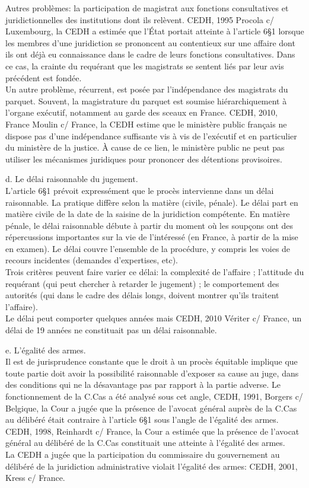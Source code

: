 \documentclass[10pt, a4paper, openany]{book}
\begin{document}
Autres problèmes: la participation de magistrat aux fonctions consultatives et juridictionnelles des institutions dont ils relèvent. CEDH, 1995 Procola c/ Luxembourg, la CEDH a estimée que l'État portait atteinte à l'article 6§1 lorsque les membres d'une juridiction se prononcent au contentieux sur une affaire dont ils ont déjà eu connaissance dans le cadre de leurs fonctions consultatives. Dans ce cas, la crainte du requérant que les magistrats se sentent liés par leur avis précédent est fondée. \\
Un autre problème, récurrent, est posée par l'indépendance des magistrats du parquet. Souvent, la magistrature du parquet est soumise hiérarchiquement à l'organe exécutif, notamment au garde des sceaux en France. CEDH, 2010, France Moulin c/ France, la CEDH estime que le ministère public français ne dispose pas d'une indépendance suffisante vis à vis de l'exécutif et en particulier du ministère de la justice. À cause de ce lien, le ministère public ne peut pas utiliser les mécanismes juridiques pour prononcer des détentions provisoires. 


d. Le délai raisonnable du jugement. \\
L'article 6§1 prévoit expressément que le procès intervienne dans un délai raisonnable. La pratique diffère selon la matière (civile, pénale). Le délai part en matière civile de la date de la saisine de la juridiction compétente. En matière pénale, le délai raisonnable débute à partir du moment où les soupçons ont des répercussions importantes sur la vie de l'intéressé (en France, à partir de la mise en examen). Le délai couvre l'ensemble de la procédure, y compris les voies de recours incidentes (demandes d'expertises, etc). \\
Trois critères peuvent faire varier ce délai: la complexité de l'affaire ; l'attitude du requérant (qui peut chercher à retarder le jugement) ; le comportement des autorités (qui dans le cadre des délais longs, doivent montrer qu'ils traitent l'affaire). \\
Le délai peut comporter quelques années mais CEDH, 2010 Vériter c/ France, un délai de 19 années ne constituait pas un délai raisonnable. 


e. L'égalité des armes. \\
Il est de jurisprudence constante que le droit à un procès équitable implique que toute partie doit avoir la possibilité raisonnable d'exposer sa cause au juge, dans des conditions qui ne la désavantage pas par rapport à la partie adverse. Le fonctionnement de la C.Cas a été analysé sous cet angle, CEDH, 1991, Borgers c/ Belgique, la Cour a jugée que la présence de l'avocat général auprès de la C.Cas au délibéré était contraire à l'article 6§1 sous l'angle de l'égalité des armes. CEDH, 1998, Reinhardt c/ France, la Cour a estimée que la présence de l'avocat général au délibéré de la C.Cas constituait une atteinte à l'égalité des armes. \\
La CEDH a jugée que la participation du commissaire du gouvernement au délibéré de la juridiction administrative violait l'égalité des armes: CEDH, 2001, Kress c/ France. 
\end{document}

